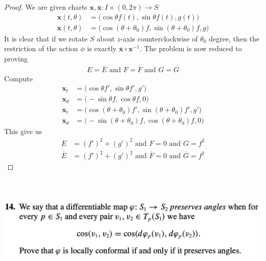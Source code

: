 \documentclass{report}
\begin{document}
\begin{proof}
We are given charts $\textbf{x},\overline{\textbf{x}}:I \times (0,2\pi)\rightarrow S$ 
\begin{align*}
\textbf{x}(t,\theta)&= \Big(\cos \theta f(t),\sin \theta f(t), g(t) \Big)\\
\overline{\textbf{x}}(t,\theta)&=\Big(\cos (\theta + \theta_0)f, \sin (\theta+\theta_0)f,g \Big)
\end{align*}
It is clear that if we rotate $S$ about $z$-axis counterclockwise of $\theta_0$ degree, then the restriction of the action $\phi$ is exactly $\overline{\textbf{x}}\circ \textbf{x}^{-1}$. The problem is now reduced to proving 
\begin{align*}
E=\overline{E}\text{ and }F=\overline{F}\text{ and }G=\overline{G}
\end{align*}
Compute 
\begin{align*}
\textbf{x}_t&=\Big(\cos \theta f', \sin \theta f', g' \Big)\\
\textbf{x}_\theta&=\Big( -\sin \theta f, \cos \theta f, 0 \Big)\\
\overline{\textbf{x}}_t&=\Big(\cos (\theta+\theta_0)f', \sin (\theta+ \theta_0)f',g'  \Big)\\
\overline{\textbf{x}}_\theta&=\Big( -\sin (\theta + \theta_0) f, \cos (\theta + \theta_0)f,0 \Big)
\end{align*}
This give us 
\begin{align*}
E&=(f')^2 +(g')^2\text{ and }F=0\text{ and }G=f^2\\
\overline{E}&=(f')^2+(g')^2\text{ and }\overline{F}=0\text{ and }\overline{G}=f^2
\end{align*}
\end{proof}
\begin{question}{}{}
\includegraphics[height=5cm,width=18cm]{hw66}
\end{question}
\end{document}
